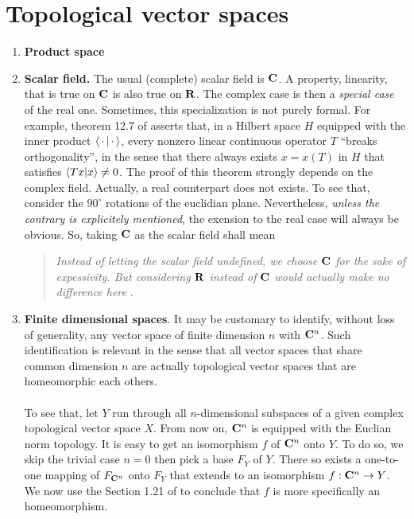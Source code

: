\section*{Topological vector spaces}
\begin{enumerate}
\item{{\bf Product space}}
\item {\bf Scalar field.} The usual (complete) scalar field is ${\mathbf C}$. %
A property, \eg linearity, that is true on ${\mathbf C}$ is also true on ${\mathbf R}$. %
The complex case is then a {\it special case} of the real one. %
Sometimes, this specialization is not purely formal. %
For example, theorem 12.7 of \cite{FA} asserts that, in a Hilbert space $H$ %
equipped with the inner product $\bra{\,\cdot\,}\ket{\,\cdot\,}$, %
every nonzero linear continuous operator $T$ ``breaks orthogonality'', %
in the sense that there always exists $x=x(T)$ in $H$ that satisfies %
%
  $\bra{Tx}\ket{x} \neq 0$. %
%
The proof of this theorem strongly depends on the complex field. %
Actually, a real counterpart does not exists. %
To see that, consider the $90^\circ$ rotations of the euclidian plane. %
%
Nevertheless, {\it unless the contrary is explicitely mentioned}, %
the exension to the real case will always be obvious. %
So, taking ${\mathbf C}$ as the scalar field shall mean %
%
\begin{quote}{\it %
Instead of letting the scalar field undefined, we choose ${\mathbf C}$ for the sake of %
expessivity. But considering ${\mathbf R}$ instead of %
${\mathbf C}$ would actually make no difference here
}. %
\end{quote}
%
\item {\bf Finite dimensional spaces}. %
It may be customary to identify, without loss of generality, %
any vector space of finite dimension $n$ with ${\mathbf C}^n$. %
%
Such identification is relevant in the sense that all vector spaces that %
share common dimension $n$ are actually topological vector spaces that are %
homeomorphic each others. \\
\\
To see that, let $Y$ run through all $n$-dimensional subspaces of %
a given complex topological vector space $X$. %
From now on, ${\mathbf C}^n$ is equipped with the Euclian norm topology. %
%
It is easy to get an isomorphism $f$ of ${\mathbf C}^n$ onto $Y$. %
To do so, we skip the trivial case $n=0$ then pick a base $F_Y$ of $Y$. %
There so exists a one-to-one mapping of $F_{{\mathbf C}^n}$ onto $ F_Y$ that %
extends to an isomorphism $f: {\mathbf C}^n \to Y$. %
%
We now use the Section 1.21 of \cite{FA} to conclude that %
$f$ is more specifically an homeomorphism. %

\end{enumerate}
